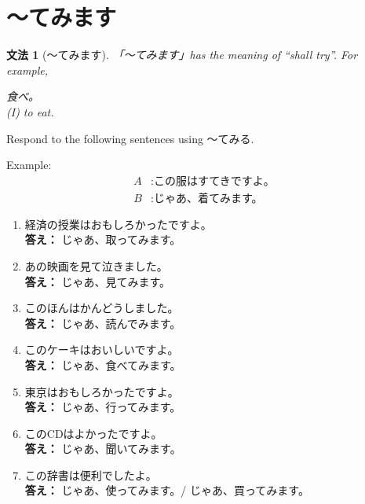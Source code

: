 \documentclass[notoc,notitlepage]{tufte-book}
\newtheorem{grammar}{\faBook \enspace 文法}[section]
\begin{document}
\section{〜てみます}%
\label{sec:_temimasu}

\begin{grammar}[〜てみます]
\label{grammar:_temimasu}
  「〜てみます」has the meaning of ``shall try''. For example,
  \begin{center}
    食べ。\\
    (I)  to eat.
  \end{center}
\end{grammar}

\begin{ex}
  Respond to the following sentences using 〜てみる.

  Example:
  \begin{align*}
    A &: \text{この服はすてきですよ。} \\
    B &: \text{じゃあ、着てみます。}
  \end{align*}

  \begin{enumerate}
    \item 経済の授業はおもしろかったですよ。 \\
      \textbf{答え：} じゃあ、取ってみます。
    \item あの映画を見て泣きました。 \\
      \textbf{答え：} じゃあ、見てみます。
    \item このほんはかんどうしました。 \\
      \textbf{答え：} じゃあ、読んでみます。
    \item このケーキはおいしいですよ。 \\
      \textbf{答え：} じゃあ、食べてみます。
    \item 東京はおもしろかったですよ。 \\
      \textbf{答え：} じゃあ、行ってみます。
    \item このCDはよかったですよ。 \\
      \textbf{答え：} じゃあ、聞いてみます。
    \item この辞書は便利でしたよ。 \\
      \textbf{答え：} じゃあ、使ってみます。/ じゃあ、買ってみます。
  \end{enumerate}
\end{ex}
\end{document}
